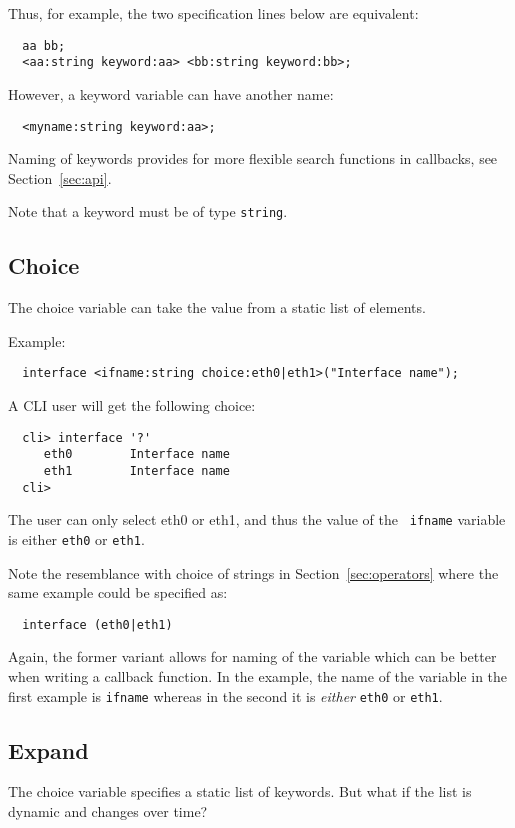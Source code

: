 \documentclass[a4paper, 10pt] {article}
\begin{document}
Thus, for example, the two specification lines below are equivalent:
\begin{verbatim}
  aa bb;
  <aa:string keyword:aa> <bb:string keyword:bb>;
\end{verbatim}

However, a keyword variable can have another name:
\begin{verbatim}
  <myname:string keyword:aa>;
\end{verbatim}

Naming of keywords provides for more flexible search functions
in callbacks, see Section~\ref{sec:api}.

Note that a keyword must be of type {\tt string}.

\subsection{Choice}

The choice variable can take the value from a static list of elements.

Example:
\begin{verbatim}
  interface <ifname:string choice:eth0|eth1>("Interface name");
\end{verbatim}

A CLI user will get the following choice:
\begin{verbatim}
  cli> interface '?'
     eth0        Interface name
     eth1        Interface name
  cli> 
\end{verbatim}
The user can only select eth0 or eth1, and thus the value of the {\tt
  ifname} variable is either {\tt eth0} or {\tt eth1}.

Note the resemblance with choice of strings in
Section~\ref{sec:operators} where the same example could be specified
as:
\begin{verbatim}
  interface (eth0|eth1)
\end{verbatim}

Again, the former variant allows for naming of the variable which can
be better when writing a callback function. In the example, the name
of the variable in the first example is {\tt ifname} whereas in the
second it is \emph{either} {\tt eth0} or {\tt eth1}.

\subsection{Expand}
\label{sec:expand1}
The choice variable specifies a static list of
keywords. But what if the list is dynamic and changes over time?
\end{document}

